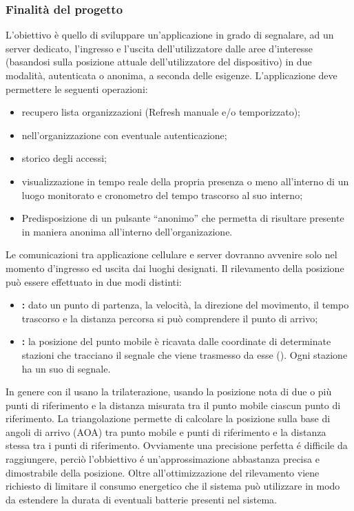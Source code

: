 	\subsubsection{Finalità del progetto}
		L’obiettivo è quello di sviluppare un’applicazione in grado di segnalare, ad un server dedicato, l’ingresso e l’uscita dell’utilizzatore dalle aree d’interesse (basandosi sulla posizione attuale dell'utilizzatore del dispositivo) in due modalità, autenticata o anonima, a seconda delle esigenze.
		L’applicazione deve permettere le seguenti operazioni:
		\begin{itemize}
			\item recupero lista organizzazioni (Refresh manuale e/o temporizzato);
			\item {} nell’organizzazione con eventuale autenticazione;
			\item storico degli accessi;
			\item visualizzazione in tempo reale della propria presenza o meno all’interno di un luogo monitorato e cronometro del tempo trascorso al suo interno;
			\item Predisposizione di un pulsante ``anonimo'' che permetta di risultare presente in maniera anonima all'interno dell'organizazione.
		\end{itemize}
		Le comunicazioni tra applicazione cellulare e server dovranno avvenire solo nel momento d'ingresso ed uscita dai luoghi designati. Il rilevamento della posizione può essere effettuato in due modi distinti:
		\begin{itemize}
			\item \textbf{:} dato un punto di partenza, la velocità, la direzione del movimento, il tempo trascorso e la distanza percorsa si può comprendere il punto di arrivo;
			\item \textbf{:} la posizione del punto mobile è ricavata dalle coordinate di determinate stazioni che tracciano il segnale che viene trasmesso da esse (). Ogni stazione ha un suo  di segnale.
		\end{itemize}
		In genere con il  usano la trilaterazione, usando la posizione nota di due o più punti di riferimento e la distanza misurata tra il punto mobile ciascun punto di riferimento. La triangolazione permette di calcolare la posizione sulla base di angoli di arrivo (AOA) tra punto mobile e punti di riferimento e la distanza stessa tra i punti di riferimento. Ovviamente una precisione perfetta é difficile da raggiungere, perciò l'obbiettivo é un'approssimazione abbastanza precisa e dimostrabile della posizione. Oltre all'ottimizzazione del rilevamento viene richiesto di limitare il consumo energetico che il sistema può utilizzare in modo da estendere la durata di eventuali batterie presenti nel sistema.

